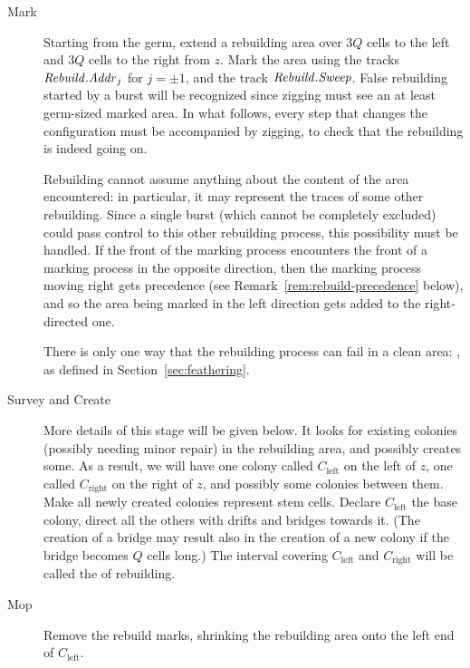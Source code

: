 \documentclass[11pt]{memoir}
\theoremstyle{definition} %
\newcommand{\fld}[1]{\ensuremath{\textit{#1\/}}}
\newcommand{\Q}{Q}
\newcommand{\Addr}{\fld{Addr}}
\newcommand{\Rebuild}{\fld{Rebuild}}
\newcommand{\Sweep}{\fld{Sweep}}
\newcommand{\Left}{\text{left}}
\newcommand{\Right}{\text{right}}
\begin{document}
\begin{description}
 \item[Mark] Starting from the germ, extend a rebuilding area  over \( 3\Q \) cells to the left 
and \( 3\Q \) cells to the right from \( z \).
Mark the area using the tracks \( \Rebuild.\Addr_{j} \) for \( j=\pm 1 \),
and the track \( \Rebuild.\Sweep \).
False rebuilding started by a burst will be recognized since
zigging must see an at least germ-sized marked area.
In what follows, every step that changes the configuration must be accompanied by zigging, to check that
the rebuilding is indeed going on.

Rebuilding cannot assume anything about the content of the area encountered: in particular,
it may represent the traces of some other rebuilding.
Since a single burst (which cannot be completely excluded) could pass
control to this other rebuilding process, this possibility must be handled.
If the front of the marking process encounters the front of a marking process in the opposite direction, then
the marking process moving right gets precedence (see Remark~\ref{rem:rebuild-precedence} below),
and so the area being marked in the left direction gets added to the right-directed one.

There is only one way that the rebuilding process can fail in a clean area: ,
as defined in Section~\ref{sec:feathering}.

 \item[Survey and Create]
More details of this stage will be given below.
It looks for existing colonies (possibly needing minor repair) in the rebuilding area, and 
possibly creates some.
As a result, we will have one colony called \( C_{\Left} \) 
on the left of \( z \), one called \( C_{\Right} \) on the right of \( z \),
and possibly some colonies between them.
Make all newly created colonies represent stem cells.
Declare \( C_{\Left} \) the base colony, direct all the others
with drifts and bridges towards it.
(The creation of a bridge may result also in the creation of a new 
colony if the bridge becomes \( \Q \) cells long.)
The interval covering \( C_{\Left} \) and \( C_{\Right} \)
will be called the  of rebuilding.

\item[Mop] Remove the rebuild marks, shrinking the rebuilding area onto the left end of \( C_{\Left} \).
\end{description}
\end{document}
